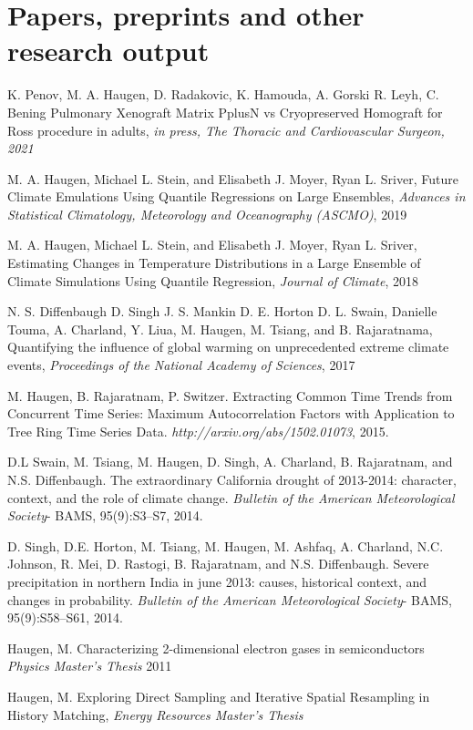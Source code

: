 \documentclass[letterpaper, 12pt]{article}
\renewenvironment{itemize}{
  \begin{list}{}{
    \setlength{\leftmargin}{1.5em}
  }
}{
  \end{list}
}
\begin{document}
\section*{Papers, preprints and other research output}
\begin{itemize}
  \item {K. Penov, M. A. Haugen, D. Radakovic, K. Hamouda, A. Gorski
R. Leyh, C. Bening} Pulmonary Xenograft Matrix PplusN vs Cryopreserved Homograft for Ross procedure in adults, \emph{in press, The Thoracic and Cardiovascular Surgeon, 2021}
  \item{M. A. Haugen, Michael L. Stein, and Elisabeth J. Moyer, Ryan L. Sriver, Future Climate Emulations Using Quantile Regressions on Large Ensembles, \emph{Advances in Statistical Climatology, Meteorology and Oceanography (ASCMO)}, 2019}
  \item{M. A. Haugen, Michael L. Stein, and Elisabeth J. Moyer, Ryan L. Sriver, Estimating Changes in Temperature Distributions in a Large Ensemble of Climate Simulations Using Quantile Regression, \emph{Journal of Climate}, 2018}
  \item N. S. Diffenbaugh D. Singh J. S. Mankin D. E. Horton D. L. Swain, Danielle Touma, A. Charland, Y. Liua, M. Haugen, M. Tsiang, and B. Rajaratnama, Quantifying the influence of global warming on unprecedented extreme climate events, \emph{Proceedings of the National Academy of Sciences}, 2017
\item M. Haugen, B. Rajaratnam, P. Switzer. Extracting Common Time
  Trends from Concurrent Time Series: Maximum Autocorrelation Factors
  with Application to Tree Ring Time Series Data. \emph{http://arxiv.org/abs/1502.01073}, 2015.
\item D.L Swain, M. Tsiang, M. Haugen, D. Singh, A. Charland, B. Rajaratnam, and N.S. Diffenbaugh.
The extraordinary California drought of 2013-2014: character, context, and the role of climate
change. \emph{Bulletin of the American Meteorological Society}- BAMS,
95(9):S3--S7, 2014.
\item D. Singh, D.E. Horton, M. Tsiang, M. Haugen, M. Ashfaq, A. Charland, N.C. Johnson, R. Mei, D. Rastogi,  B. Rajaratnam, and N.S. Diffenbaugh. Severe precipitation in northern India in june
2013: causes, historical context, and changes in probability. \emph{Bulletin of the American Meteorological
Society}- BAMS, 95(9):S58--S61, 2014.
\item Haugen, M. Characterizing 2-dimensional electron gases in semiconductors \emph{Physics Master's Thesis} 2011
\item Haugen, M. Exploring Direct Sampling and Iterative Spatial
Resampling in History Matching, \emph{Energy Resources Master's Thesis}
\end{itemize}
\end{document}

